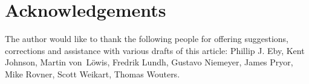 \documentclass{howto}
\begin{document}
\section{Acknowledgements \label{acks}}

The author would like to thank the following people for offering
suggestions, corrections and assistance with various drafts of this
article: Phillip J. Eby, Kent Johnson, Martin von~L\"owis, Fredrik Lundh, 
Gustavo Niemeyer, James Pryor, Mike Rovner, Scott Weikart, Thomas Wouters.
\end{document}
